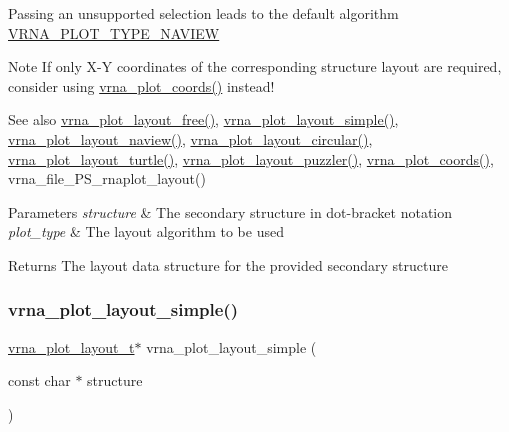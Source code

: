 Passing an unsupported selection leads to the default algorithm \mbox{\hyperlink{group__plot__layout__utils_ga94d4c863ecac2f220f76658afb92f964}{V\+R\+N\+A\+\_\+\+P\+L\+O\+T\+\_\+\+T\+Y\+P\+E\+\_\+\+N\+A\+V\+I\+EW}}

\begin{DoxyNote}{Note}
If only X-\/Y coordinates of the corresponding structure layout are required, consider using \mbox{\hyperlink{group__plot__layout__utils_ga2e2adbef0283a8ff2dfe5284eb1f4a6a}{vrna\+\_\+plot\+\_\+coords()}} instead!
\end{DoxyNote}
\begin{DoxySeeAlso}{See also}
\mbox{\hyperlink{group__plot__layout__utils_ga996128730020a2d7a7368b4248195931}{vrna\+\_\+plot\+\_\+layout\+\_\+free()}}, \mbox{\hyperlink{group__plot__layout__utils_ga8b09019a429c7c2447be94901c7ed658}{vrna\+\_\+plot\+\_\+layout\+\_\+simple()}}, \mbox{\hyperlink{group__plot__layout__utils_gab0e886afe200db9323e4e65d44738177}{vrna\+\_\+plot\+\_\+layout\+\_\+naview()}}, \mbox{\hyperlink{group__plot__layout__utils_ga41d94adbd42e1a570d840756e6dd6909}{vrna\+\_\+plot\+\_\+layout\+\_\+circular()}}, \mbox{\hyperlink{group__plot__layout__utils_ga4ecd3401e22933a44bf31d14320e59b1}{vrna\+\_\+plot\+\_\+layout\+\_\+turtle()}}, \mbox{\hyperlink{group__plot__layout__utils_ga57f815d56c8c083c016381213f581f1e}{vrna\+\_\+plot\+\_\+layout\+\_\+puzzler()}}, \mbox{\hyperlink{group__plot__layout__utils_ga2e2adbef0283a8ff2dfe5284eb1f4a6a}{vrna\+\_\+plot\+\_\+coords()}}, vrna\+\_\+file\+\_\+\+P\+S\+\_\+rnaplot\+\_\+layout()
\end{DoxySeeAlso}

\begin{DoxyParams}{Parameters}
{\em structure} & The secondary structure in dot-\/bracket notation \\
\hline
{\em plot\+\_\+type} & The layout algorithm to be used \\
\hline
\end{DoxyParams}
\begin{DoxyReturn}{Returns}
The layout data structure for the provided secondary structure 
\end{DoxyReturn}
\mbox{\label{group__plot__layout__utils_ga8b09019a429c7c2447be94901c7ed658}} 
\subsubsection{\texorpdfstring{vrna\_plot\_layout\_simple()}{vrna\_plot\_layout\_simple()}}
{\footnotesize\ttfamily \mbox{\hyperlink{group__plot__layout__utils_gac986fe092abc2a6a93ceb5141e4dd28b}{vrna\+\_\+plot\+\_\+layout\+\_\+t}}$\ast$ vrna\+\_\+plot\+\_\+layout\+\_\+simple (\begin{DoxyParamCaption}\item[{const char $\ast$}]{structure }\end{DoxyParamCaption})}



